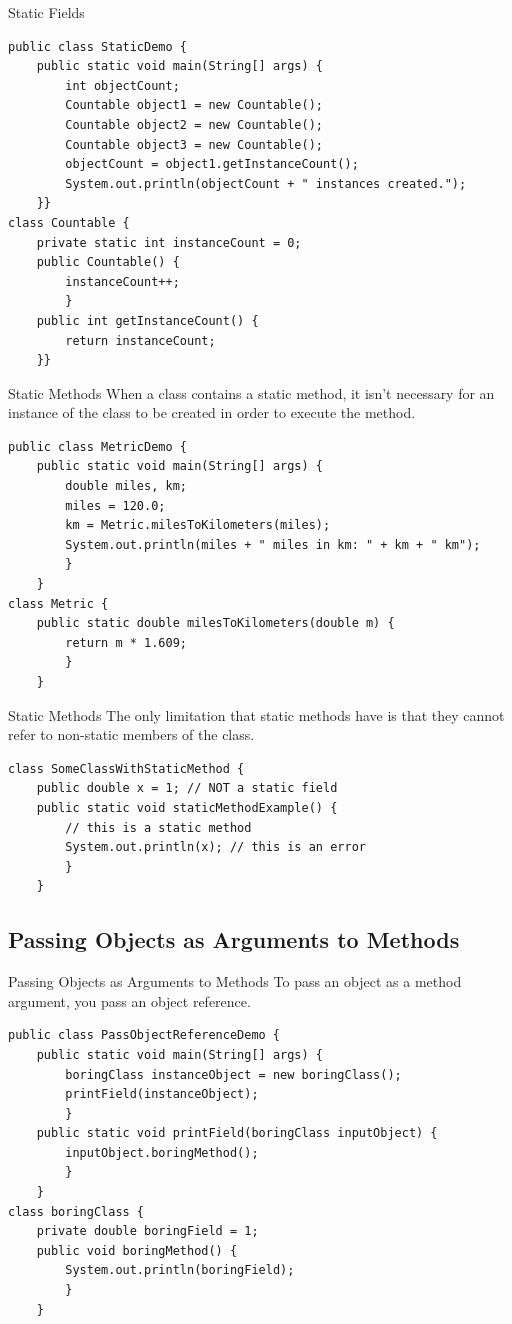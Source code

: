 \documentclass[11pt]{beamer}
\begin{document}
\begin{frame}[fragile]{Static Fields}
    \begin{lstlisting}[basicstyle=\ttfamily\footnotesize]
public class StaticDemo {
	public static void main(String[] args) {
		int objectCount;
		Countable object1 = new Countable();
		Countable object2 = new Countable();
		Countable object3 = new Countable();
		objectCount = object1.getInstanceCount();
		System.out.println(objectCount + " instances created."); 
    }}
class Countable {
	private static int instanceCount = 0;
	public Countable() {
		instanceCount++;
		}
	public int getInstanceCount() {
		return instanceCount;
	}}
    \end{lstlisting}
\end{frame}

\begin{frame}[fragile]{Static Methods}
    When a class contains a static method, it isn't necessary for an instance of the class to be created in order to execute the method.
    \begin{lstlisting}
public class MetricDemo {
	public static void main(String[] args) {
		double miles, km;
		miles = 120.0;
		km = Metric.milesToKilometers(miles);
		System.out.println(miles + " miles in km: " + km + " km");
		}
	}
class Metric {
	public static double milesToKilometers(double m) {
		return m * 1.609;
		}
	}
    \end{lstlisting}
\end{frame}

\begin{frame}[fragile]{Static Methods}
    The only limitation that static methods have is that they cannot refer to non-static members of the class.
    \begin{lstlisting}
class SomeClassWithStaticMethod {
    public double x = 1; // NOT a static field
    public static void staticMethodExample() {
        // this is a static method
        System.out.println(x); // this is an error
        }
    }
    \end{lstlisting}
\end{frame}

\subsection{Passing Objects as Arguments to Methods}
\begin{frame}[fragile]{Passing Objects as Arguments to Methods}
    To pass an object as a method argument, you pass an object reference.
    \begin{lstlisting}
public class PassObjectReferenceDemo {
	public static void main(String[] args) {
		boringClass instanceObject = new boringClass();
		printField(instanceObject);
		}
	public static void printField(boringClass inputObject) {
		inputObject.boringMethod();
		}
	}
class boringClass {
	private double boringField = 1;
	public void boringMethod() {
		System.out.println(boringField);
		}
	}
    \end{lstlisting}
\end{frame}
\end{document}
